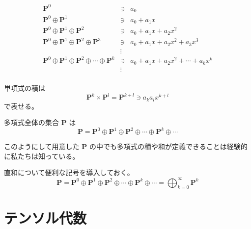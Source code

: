 \documentclass[uplatex,a4j,12pt,dvipdfmx]{jsarticle}
\begin{document}
\[
	\begin{array}{rcl}
		\mathbf{P}^{0}                                                                                 & \ni    & a_{0}                                                \\
		\mathbf{P}^{0} \oplus \mathbf{P}^{1}                                                           & \ni    & a_{0} + a_{1} x                                      \\
		\mathbf{P}^{0} \oplus \mathbf{P}^{1} \oplus \mathbf{P}^{2}                                     & \ni    & a_{0} + a_{1} x + a_{2} x^{2}                        \\
		\mathbf{P}^{0} \oplus \mathbf{P}^{1} \oplus \mathbf{P}^{2} \oplus \mathbf{P}^{3}               & \ni    & a_{0} + a_{1} x + a_{2} x^{2} + a_{3} x^{3}          \\
		                                                                                               & \vdots &                                                      \\
		\mathbf{P}^{0} \oplus \mathbf{P}^{1} \oplus \mathbf{P}^{2} \oplus \cdots \oplus \mathbf{P}^{k} & \ni    & a_{0} + a_{1} x + a_{2} x^{2} + \cdots + a_{k} x^{k} \\
		                                                                                               & \vdots &                                                      \\
	\end{array}
\]

単項式の積は
$$
	\mathbf{P}^{k} \times \mathbf{P}^{l} = \mathbf{P}^{k+l} \ni a_{k} a_{l} x^{k+l}
$$
で表せる。

多項式全体の集合 $\mathbf{P}$ は
$$
	\mathbf{P}
	=
	\mathbf{P}^{0} \oplus \mathbf{P}^{1} \oplus \mathbf{P}^{2} \oplus \cdots \oplus \mathbf{P}^{k} \oplus \cdots
$$

このようにして用意した $\mathbf{P}$ の中でも多項式の積や和が定義できることは経験的に私たちは知っている。

直和について便利な記号を導入しておく。
$$
	\mathbf{P}
	=
	\mathbf{P}^{0} \oplus \mathbf{P}^{1} \oplus \mathbf{P}^{2} \oplus \cdots \oplus \mathbf{P}^{k} \oplus \cdots
	=
	\displaystyle \bigoplus_{k=0}^{\infty} \mathbf{P}^{k}
$$

\section{テンソル代数}
\end{document}
